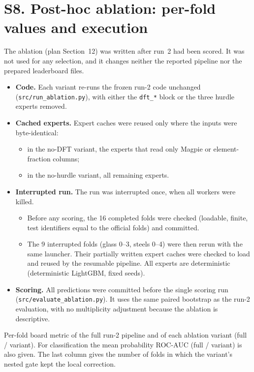 \documentclass[11pt]{article}
\begin{document}
\section*{S8. Post-hoc ablation: per-fold values and execution}
The ablation (plan Section~12) was written after run~2 had been scored. It was not used for any selection, and it changes neither the reported pipeline nor the prepared leaderboard files.

\begin{itemize}
\item \textbf{Code.} Each variant re-runs the frozen run-2 code unchanged (\texttt{src/run\_ablation.py}), with either the \texttt{dft\_*} block or the three hurdle experts removed.
\item \textbf{Cached experts.} Expert caches were reused only where the inputs were byte-identical:
  \begin{itemize}
  \item in the no-DFT variant, the experts that read only Magpie or element-fraction columns;
  \item in the no-hurdle variant, all remaining experts.
  \end{itemize}
\item \textbf{Interrupted run.} The run was interrupted once, when all workers were killed.
  \begin{itemize}
  \item Before any scoring, the 16 completed folds were checked (loadable, finite, test identifiers equal to the official folds) and committed.
  \item The 9 interrupted folds (glass 0--3, steels 0--4) were then rerun with the same launcher. Their partially written expert caches were checked to load and reused by the resumable pipeline. All experts are deterministic (deterministic LightGBM, fixed seeds).
  \end{itemize}
\item \textbf{Scoring.} All predictions were committed before the single scoring run (\texttt{src/evaluate\_ablation.py}). It uses the same paired bootstrap as the run-2 evaluation, with no multiplicity adjustment because the ablation is descriptive.
\end{itemize}

\begin{table}[h]
\centering
\caption{Per-fold board metric of the full run-2 pipeline and of each ablation variant (full / variant). For classification the mean probability ROC-AUC (full / variant) is also given. The last column gives the number of folds in which the variant's nested gate kept the local correction.}
\begin{adjustbox}{max width=\textwidth}

\end{adjustbox}
\end{table}
\end{document}

